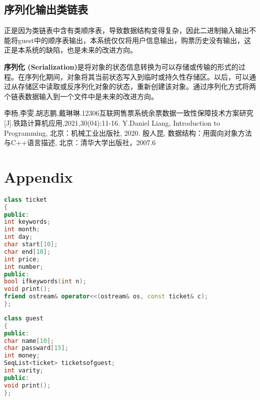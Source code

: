 \documentclass{apmcmthesis}
\begin{document}
	
\subsection{序列化输出类链表}
正是因为类链表中含有类顺序表，导致数据结构变得复杂，因此二进制输入输出不能将guest中的顺序表输出，本系统仅仅将用户信息输出，购票历史没有输出，这正是本系统的缺陷，也是未来的改进方向。

\textbf{序列化 (Serialization)}是将对象的状态信息转换为可以存储或传输的形式的过程。在序列化期间，对象将其当前状态写入到临时或持久性存储区。以后，可以通过从存储区中读取或反序列化对象的状态，重新创建该对象。通过序列化方式将两个链表数据输入到一个文件中是未来的改进方向。














\begin{thebibliography}{9}%
李杨,李雯,胡志鹏,戴琳琳.12306互联网售票系统余票数据一致性保障技术方案研究[J].铁路计算机应用,2021,30(04):11-16.
 Y.Daniel Liang, Introduction to Programming, 北京：机械工业出版社, 2020.
 殷人昆, 数据结构：用面向对象方法与C++语言描述, 北京：清华大学出版社，2007.6
\end{thebibliography}

\newpage

\section{Appendix}
\begin{lstlisting}[language=c++,caption={ticket类}]
class ticket
{
public:
int keywords;
int month;
int day;
char start[10];
char end[10];
int price;
int number;
public:
bool ifkeywords(int n);
void print();
friend ostream& operator<<(ostream& os, const ticket& c);
};
 \end{lstlisting}
 
 
 
\begin{lstlisting}[language=c++,caption={guest类}]
class guest
{
public:
char name[10];
char passward[15];
int money;
SeqList<ticket> ticketsofguest;
int varity;
public:
void print();
};
 \end{lstlisting}
 
\end{document}
